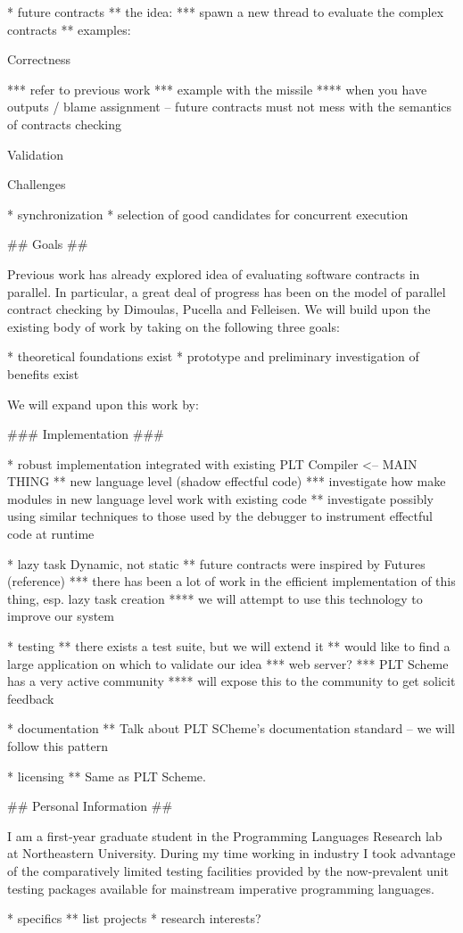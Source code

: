 * future contracts
** the idea:
*** spawn a new thread to evaluate the complex contracts
** examples:

Correctness

*** refer to previous work
*** example with the missile
**** when you have outputs / blame assignment -- future contracts must not mess with the semantics of contracts checking

Validation

Challenges

* synchronization
* selection of good candidates for concurrent execution

## Goals ##

Previous work has already explored idea of evaluating software
contracts in parallel. In particular, a great deal of progress has
been on the model of parallel contract checking by Dimoulas, Pucella
and Felleisen. We will build upon the existing body of work by taking
on the following three goals:

* theoretical foundations exist
* prototype and preliminary investigation of benefits exist

We will expand upon this work by:

### Implementation ###

* robust implementation integrated with existing PLT Compiler <-- MAIN THING
** new language level (shadow effectful code)
*** investigate how make modules in new language level work with existing code
** investigate possibly using similar techniques to those used by the debugger to instrument effectful code at runtime

* lazy task
  Dynamic, not static
** future contracts were inspired by Futures (reference)
*** there has been a lot of work in the efficient implementation of this thing, esp. lazy task creation
**** we will attempt to use this technology to improve our system

* testing
** there exists a test suite, but we will extend it
** would like to find a large application on which to validate our idea
*** web server?
*** PLT Scheme has a very active community
**** will expose this to the community to get solicit feedback

* documentation
** Talk about PLT SCheme's documentation standard -- we will follow this pattern

* licensing
** Same as PLT Scheme. 

## Personal Information ##

I am a first-year graduate student in the Programming Languages
Research lab at Northeastern University. During my time working in
industry I took advantage of the comparatively limited testing
facilities provided by the now-prevalent unit testing packages
available for mainstream imperative programming languages.

* specifics
** list projects
* research interests?
